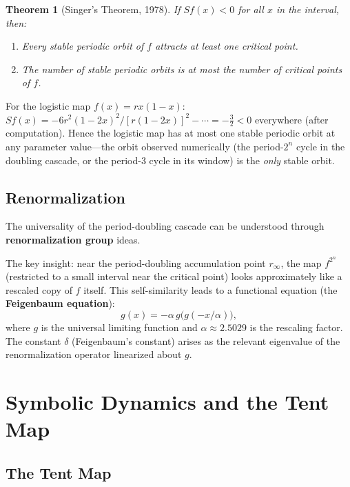 \documentclass[11pt,letterpaper]{article}
\theoremstyle{definition}
\theoremstyle{plain}
\newtheorem{theorem}{Theorem}[section]
\theoremstyle{remark}
\begin{document}
\begin{theorem}[Singer's Theorem, 1978]
If $Sf(x) < 0$ for all $x$ in the interval, then:
\begin{enumerate}[leftmargin=2em]
  \item Every stable periodic orbit of $f$ attracts at least one
    critical point.
  \item The number of stable periodic orbits is at most the number
    of critical points of $f$.
\end{enumerate}
\end{theorem}

For the logistic map $f(x) = rx(1-x)$:
$Sf(x) = -6r^2(1-2x)^2/[r(1-2x)]^2 - \cdots = -\frac{3}{2} < 0$
everywhere (after computation).  Hence the logistic map has at most
one stable periodic orbit at any parameter value---the orbit observed
numerically (the period-$2^n$ cycle in the doubling cascade, or the
period-3 cycle in its window) is the \emph{only} stable orbit.

\subsection{Renormalization}\label{sec:renormalization}

The universality of the period-doubling cascade can be understood through
\textbf{renormalization group} ideas.

The key insight: near the period-doubling accumulation point $r_\infty$,
the map $f^{2^n}$ (restricted to a small interval near the critical point)
looks approximately like a rescaled copy of $f$ itself.  This self-similarity
leads to a functional equation (the \textbf{Feigenbaum equation}):
\begin{equation}
  g(x) = -\alpha\, g\bigl(g(-x/\alpha)\bigr),
\end{equation}
where $g$ is the universal limiting function and
$\alpha \approx 2.5029$ is the rescaling factor.  The constant $\delta$
(Feigenbaum's constant) arises as the relevant eigenvalue of the
renormalization operator linearized about $g$.


\section{Symbolic Dynamics and the Tent Map}\label{sec:symbolic}

\subsection{The Tent Map}
\end{document}
